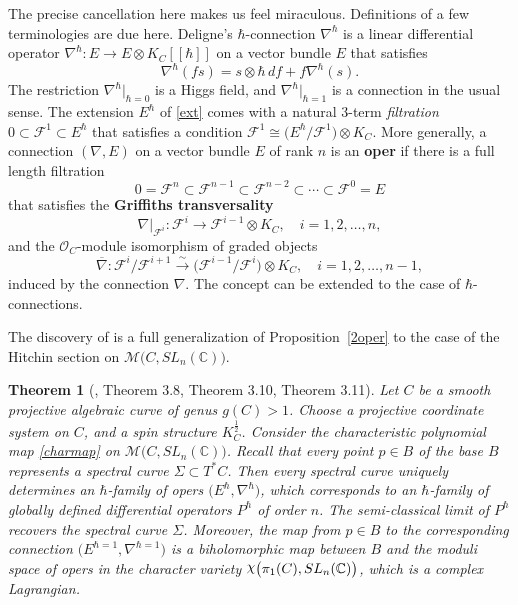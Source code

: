 \documentclass{amsart}
\newtheorem{thm}{Theorem}[section]
\theoremstyle{definition}
\numberwithin{equation}{section}
\numberwithin{figure}{section}
\def\rchi{{\hbox{\raise1.5pt\hbox{$\chi$}}}}
\def\isom{\cong}
\def\tensor{\otimes}
\newcommand{\bC}{{\mathbb{C}}}
\newcommand{\cM}{{\mathcal{M}}}
\newcommand{\cF}{{\mathcal{F}}}
\newcommand{\cO}{{\mathcal{O}}}
\newcommand{\half}{{\frac{1}{2}}}
\newcommand{\lrar}{\longrightarrow}
\begin{document}
The precise cancellation here makes us feel miraculous. 
Definitions of a few terminologies are due here. Deligne's $\hbar$-connection
$\nabla^\hbar$ is a linear differential operator 
$\nabla^\hbar:E\lrar E\tensor K_C[[\hbar]]$ on a vector bundle $E$
that satisfies 
$$
\nabla^\hbar(fs) = s\tensor \hbar\,df + f\nabla^\hbar (s).
$$
The restriction $\nabla^\hbar\big|_{\hbar = 0}$ is a Higgs field, 
and $\nabla^\hbar\big|_{\hbar = 1}$ is a connection in the usual sense.
The extension $E^\hbar$ of \eqref{ext} comes with a natural 
$3$-term \emph{filtration}
$0\subset \cF^1 \subset E^\hbar$ that satisfies a  
condition $\cF^1 \isom \big(E^\hbar\big/\cF^1\big) \tensor K_C$. 
More generally, a connection $(\nabla, E)$ on a vector bundle
$E$  of rank $n$ is an \textbf{oper} if there is a full length
filtration
$$
0=\cF^n\subset \cF^{n-1}\subset \cF^{n-2}\subset\cdots\subset \cF^0=E
$$
that satisfies the \textbf{Griffiths transversality} 
$$
\nabla\big|_{\cF^i}: \cF^i\lrar \cF^{i-1}\tensor K_C, \quad i=1, 2, \dots, n,
$$
and the $\cO_C$-module isomorphism of graded objects
$$
\overline{\nabla}: \cF^i\big/\cF^{i+1}\overset{\sim}{\lrar}
\big(\cF^{i-1}\big/\cF^{i}\big)\tensor K_C, \quad i=1, 2, \dots, n-1,
$$
induced by the connection $\nabla$. The concept can be
extended to the case of $\hbar$-connections. 


The discovery of \cite[Section~3.1]{OM5} is a full generalization
of Proposition~\ref{2oper} to the case of the Hitchin section
on $\cM\big(C,SL_n(\bC)\big)$.

\begin{thm}[\cite{OM5}, Theorem 3.8, Theorem 3.10, Theorem 3.11]
Let $C$ be a smooth projective algebraic curve of genus $g(C)>1$.
Choose a projective coordinate system on $C$, and a spin
structure $K_C^\half$. Consider the characteristic polynomial map
\eqref{charmap} on $\cM\big(C,SL_n(\bC)\big)$.
Recall that every point $p\in B$ of
the base $B$ represents a spectral curve $\Sigma\subset T^*C$. 
Then every spectral curve uniquely determines an $\hbar$-family
of opers $\big(E^\hbar, \nabla^\hbar\big)$, which corresponds to an $\hbar$-family of globally
defined differential operators $P^\hbar$ of order $n$. 
The semi-classical limit of $P^\hbar$ recovers the spectral curve 
$\Sigma$. Moreover, the map from $p\in B$ to 
the corresponding connection $\big(E^{\hbar=1}, \nabla^{\hbar=1}\big)$
is a biholomorphic map between $B$ and the moduli space
of opers in the character variety $\rchi\big(\pi_1(C),SL_n(\bC)\big)$, 
which is a complex Lagrangian.
\end{thm}
\end{document}

